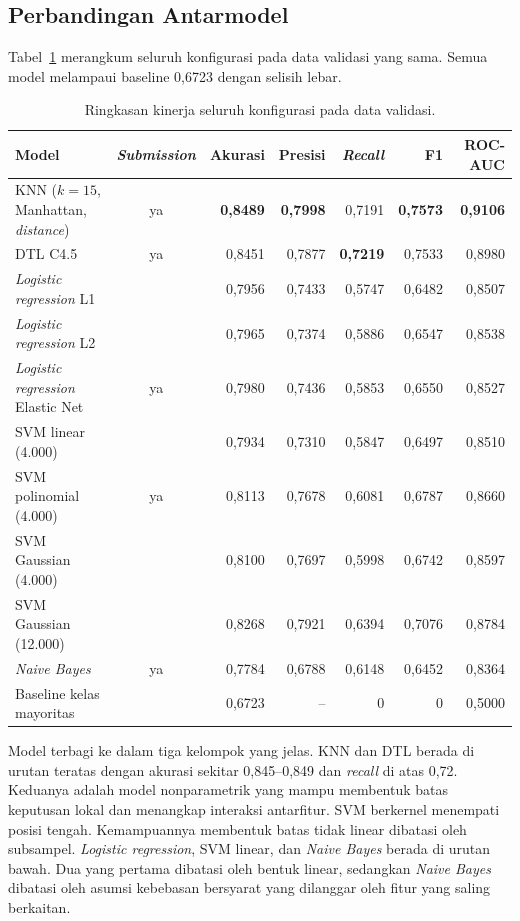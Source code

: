 \subsection{Perbandingan Antarmodel}
Tabel~\ref{tab:ringkasan} merangkum seluruh konfigurasi pada data validasi yang sama. Semua model melampaui baseline 0,6723 dengan selisih lebar.

\begin{table}[htbp]
    \centering
    \footnotesize
    \setlength{\tabcolsep}{4pt}
    \begin{tabular}{@{}l c r r r r r@{}}
        \toprule
        Model & \textit{Submission} & Akurasi & Presisi & \textit{Recall} & F1 & ROC-AUC \\
        \midrule
        KNN ($k=15$, Manhattan, \textit{distance}) & ya & \textbf{0,8489} & \textbf{0,7998} & 0,7191 & \textbf{0,7573} & \textbf{0,9106} \\
        DTL C4.5 & ya & 0,8451 & 0,7877 & \textbf{0,7219} & 0,7533 & 0,8980 \\
        \textit{Logistic regression} L1 & & 0,7956 & 0,7433 & 0,5747 & 0,6482 & 0,8507 \\
        \textit{Logistic regression} L2 & & 0,7965 & 0,7374 & 0,5886 & 0,6547 & 0,8538 \\
        \textit{Logistic regression} Elastic Net & ya & 0,7980 & 0,7436 & 0,5853 & 0,6550 & 0,8527 \\
        SVM linear (4.000) & & 0,7934 & 0,7310 & 0,5847 & 0,6497 & 0,8510 \\
        SVM polinomial (4.000) & ya & 0,8113 & 0,7678 & 0,6081 & 0,6787 & 0,8660 \\
        SVM Gaussian (4.000) & & 0,8100 & 0,7697 & 0,5998 & 0,6742 & 0,8597 \\
        SVM Gaussian (12.000) & & 0,8268 & 0,7921 & 0,6394 & 0,7076 & 0,8784 \\
        \textit{Naive Bayes} & ya & 0,7784 & 0,6788 & 0,6148 & 0,6452 & 0,8364 \\
        \midrule
        Baseline kelas mayoritas & & 0,6723 & -- & 0 & 0 & 0,5000 \\
        \bottomrule
    \end{tabular}
    \caption{Ringkasan kinerja seluruh konfigurasi pada data validasi.}
    \label{tab:ringkasan}
\end{table}

Model terbagi ke dalam tiga kelompok yang jelas. KNN dan DTL berada di urutan teratas dengan akurasi sekitar 0,845--0,849 dan \textit{recall} di atas 0,72. Keduanya adalah model nonparametrik yang mampu membentuk batas keputusan lokal dan menangkap interaksi antarfitur. SVM berkernel menempati posisi tengah. Kemampuannya membentuk batas tidak linear dibatasi oleh subsampel. \textit{Logistic regression}, SVM linear, dan \textit{Naive Bayes} berada di urutan bawah. Dua yang pertama dibatasi oleh bentuk linear, sedangkan \textit{Naive Bayes} dibatasi oleh asumsi kebebasan bersyarat yang dilanggar oleh fitur yang saling berkaitan.

